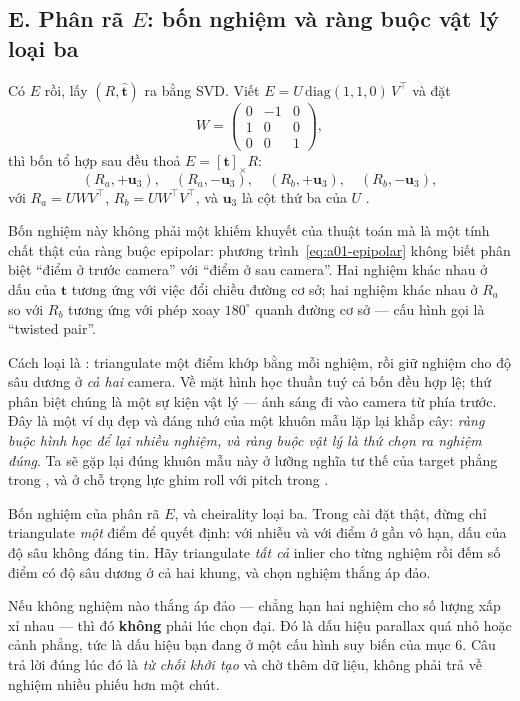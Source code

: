 \documentclass[../../vslam.tex]{subfiles}
\begin{document}
\subsection{E. Phân rã \(E\): bốn nghiệm và ràng buộc vật lý loại ba}

Có \(E\) rồi, lấy \((R, \hat{\mathbf{t}})\) ra bằng SVD. Viết \(E = U\,\mathrm{diag}(1,1,0)\,V^{\top}\) và đặt
\[
W = \begin{pmatrix} 0 & -1 & 0 \\ 1 & 0 & 0 \\ 0 & 0 & 1\end{pmatrix},
\]
thì bốn tổ hợp sau đều thoả \(E = [\mathbf{t}]_\times R\):
\[
(R_a, +\mathbf{u}_3),\quad (R_a, -\mathbf{u}_3),\quad (R_b, +\mathbf{u}_3),\quad (R_b, -\mathbf{u}_3),
\]
với \(R_a = U W V^{\top}\), \(R_b = U W^{\top} V^{\top}\), và \(\mathbf{u}_3\) là cột thứ ba của \(U\) \cite[§9.6.2]{hartley2004}.

Bốn nghiệm này không phải một khiếm khuyết của thuật toán mà là một tính chất thật của ràng buộc epipolar: phương trình~\eqref{eq:a01-epipolar} không biết phân biệt ``điểm ở trước camera'' với ``điểm ở sau camera''. Hai nghiệm khác nhau ở dấu của \(\mathbf{t}\) tương ứng với việc đổi chiều đường cơ sở; hai nghiệm khác nhau ở \(R_a\) so với \(R_b\) tương ứng với phép xoay \(180^\circ\) quanh đường cơ sở --- cấu hình gọi là ``twisted pair''.

Cách loại là : triangulate một điểm khớp bằng mỗi nghiệm, rồi giữ nghiệm cho độ sâu dương ở \emph{cả hai} camera. Về mặt hình học thuần tuý cả bốn đều hợp lệ; thứ phân biệt chúng là một sự kiện vật lý --- ánh sáng đi vào camera từ phía trước. Đây là một ví dụ đẹp và đáng nhớ của một khuôn mẫu lặp lại khắp cây: \emph{ràng buộc hình học để lại nhiều nghiệm, và ràng buộc vật lý là thứ chọn ra nghiệm đúng}. Ta sẽ gặp lại đúng khuôn mẫu này ở lưỡng nghĩa tư thế của target phẳng trong , và ở chỗ trọng lực ghim roll với pitch trong .

\begin{cannho}
Bốn nghiệm của phân rã \(E\), và cheirality loại ba. Trong cài đặt thật, đừng chỉ triangulate \emph{một} điểm để quyết định: với nhiễu và với điểm ở gần vô hạn, dấu của độ sâu không đáng tin. Hãy triangulate \emph{tất cả} inlier cho từng nghiệm rồi đếm số điểm có độ sâu dương ở cả hai khung, và chọn nghiệm thắng áp đảo.

Nếu không nghiệm nào thắng áp đảo --- chẳng hạn hai nghiệm cho số lượng xấp xỉ nhau --- thì đó \textbf{không} phải lúc chọn đại. Đó là dấu hiệu parallax quá nhỏ hoặc cảnh phẳng, tức là dấu hiệu bạn đang ở một cấu hình suy biến của mục 6. Câu trả lời đúng lúc đó là \emph{từ chối khởi tạo} và chờ thêm dữ liệu, không phải trả về nghiệm nhiều phiếu hơn một chút.
\end{cannho}
\end{document}
